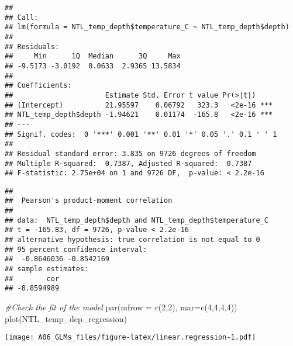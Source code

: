 \documentclass[
]{article}
\newenvironment{Shaded}{\begin{snugshade}}{\end{snugshade}}
\newcommand{\AttributeTok}[1]{\textcolor[rgb]{0.77,0.63,0.00}{#1}}
\newcommand{\CommentTok}[1]{\textcolor[rgb]{0.56,0.35,0.01}{\textit{#1}}}
\newcommand{\DecValTok}[1]{\textcolor[rgb]{0.00,0.00,0.81}{#1}}
\newcommand{\FunctionTok}[1]{\textcolor[rgb]{0.00,0.00,0.00}{#1}}
\newcommand{\NormalTok}[1]{#1}
\newcommand{\SpecialCharTok}[1]{\textcolor[rgb]{0.00,0.00,0.00}{#1}}
\begin{document}
\begin{verbatim}
## 
## Call:
## lm(formula = NTL_temp_depth$temperature_C ~ NTL_temp_depth$depth)
## 
## Residuals:
##     Min      1Q  Median      3Q     Max 
## -9.5173 -3.0192  0.0633  2.9365 13.5834 
## 
## Coefficients:
##                      Estimate Std. Error t value Pr(>|t|)    
## (Intercept)          21.95597    0.06792   323.3   <2e-16 ***
## NTL_temp_depth$depth -1.94621    0.01174  -165.8   <2e-16 ***
## ---
## Signif. codes:  0 '***' 0.001 '**' 0.01 '*' 0.05 '.' 0.1 ' ' 1
## 
## Residual standard error: 3.835 on 9726 degrees of freedom
## Multiple R-squared:  0.7387, Adjusted R-squared:  0.7387 
## F-statistic: 2.75e+04 on 1 and 9726 DF,  p-value: < 2.2e-16
\end{verbatim}

\begin{Shaded}
\end{Shaded}

\begin{verbatim}
## 
##  Pearson's product-moment correlation
## 
## data:  NTL_temp_depth$depth and NTL_temp_depth$temperature_C
## t = -165.83, df = 9726, p-value < 2.2e-16
## alternative hypothesis: true correlation is not equal to 0
## 95 percent confidence interval:
##  -0.8646036 -0.8542169
## sample estimates:
##        cor 
## -0.8594989
\end{verbatim}

\begin{Shaded}
\begin{Highlighting}[]
\CommentTok{\#Check the fit of the model}
\FunctionTok{par}\NormalTok{(}\AttributeTok{mfrow =} \FunctionTok{c}\NormalTok{(}\DecValTok{2}\NormalTok{,}\DecValTok{2}\NormalTok{), }\AttributeTok{mar=}\FunctionTok{c}\NormalTok{(}\DecValTok{4}\NormalTok{,}\DecValTok{4}\NormalTok{,}\DecValTok{4}\NormalTok{,}\DecValTok{4}\NormalTok{))}
\FunctionTok{plot}\NormalTok{(NTL\_temp\_dep\_regression)}
\end{Highlighting}
\end{Shaded}

\texttt{[image: A06\_GLMs\_files/figure-latex/linear.regression-1.pdf]}
\end{document}
